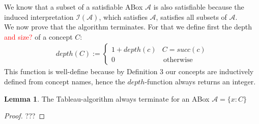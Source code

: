 \documentclass[a4paper,11pt]{scrartcl}
\theoremstyle{break}
\theoremstyle{definition}
\newtheorem{mylem}{Lemma}
\begin{document}
We know that a subset of a satisfiable ABox $\mathcal{A}$ is also satisfiable because the induced interpretation $\mathcal{I}(\mathcal{A})$, which satisfies $\mathcal{A}$, satisfies all subsets of $\mathcal{A}$.\\
We now prove that the algorithm terminates. For that we define first the depth \textcolor{red}{and size?} of a concept $C$:
\begin{align*}
depth(C):=\begin{cases}
1+depth(c) & C=succ(c) \\
0 & \, \text{otherwise}
\end{cases}
\end{align*}
This function is well-define because by Definition 3 our concepts are inductively defined from concept names, hence the $depth$-function always returns an integer.
\begin{mylem}
The Tableau-algorithm always terminate for an ABox $\mathcal{A}=\{x:C\}$
\end{mylem}
\begin{proof}
???
\end{proof}
\normalem


\end{document}
